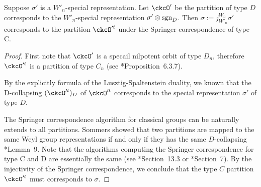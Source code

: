 \documentclass[counting_main.tex]{subfiles}
\begin{document}
\begin{lem}\label{lem:MD1}
  Suppose $\sigma'$ is a $W'_n$-special representation.%
  Let $\ckcO'$ be the partition of type $D$ corresponds to the $W'_n$-special representation
  $\sigma'\otimes \operatorname{sgn}_D$. Then $\sigma:=j_{W'_n}^{W_n} \sigma'$ corresponds to the partition $\ckcO'^t$ under the Springer correspondence of
  type C.
\end{lem}
\begin{proof}
  First note that $\ckcO'$ is a specail nilpotent orbit of type $D_n$,
  therefore $\ckcO'^t$ is a partition of type $C_n$ (see \cite{CM}*{Proposition~6.3.7}).

  By the explicitly formula of the Lusztig-Spaltenstein duality, we known that the D-collapsing
  $(\ckcO'^t)_D$ of $\ckcO'^t$ corresponds to the special representation
  $\sigma'$ of type $D$.

  The Springer correspondence algorithm for classical groups can be naturally extends to all partitions.
  Sommers showed that two partitions are mapped to the same Weyl group representations
  if and only if they has the same $D$-collapsing \cite{So}*{Lemma~9}.
  Note that the algorithms computing the Springer correspondence for type C and D are essentially the same
  (see \cite{Carter}*{Section~13.3} or \cite{So}*{Section~7}).
  By the injectivity of the Springer correspondence, we conclude that the type $C$ partition $\ckcO'^t$
  must corresponds to $\sigma$.
\end{proof}
\end{document}
